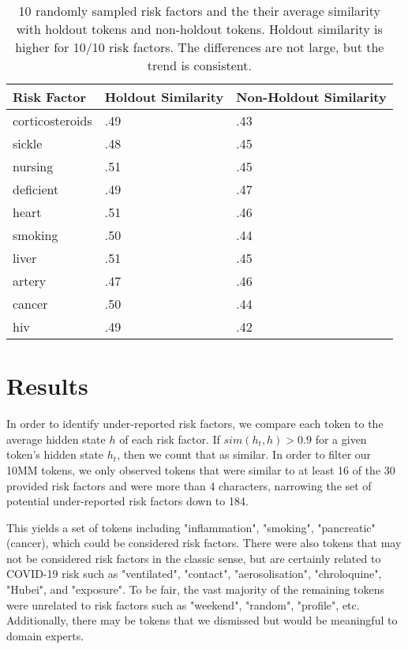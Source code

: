 \documentclass[11pt,a4paper]{article}
\begin{document}
\begin{table*}[h!]
    \centering
    \begin{tabular}{| l | l | l |}
        \hline
        Risk Factor & Holdout Similarity & Non-Holdout Similarity  \\
        \hline
        corticosteroids & .49 & .43 \\
        sickle & .48 & .45 \\
        nursing & .51 & .45 \\
        deficient & .49 & .47 \\
        heart & .51 & .46 \\
        smoking & .50 & .44 \\
        liver & .51 & .45 \\
        artery & .47 & .46 \\
        cancer & .50 & .44 \\
        hiv & .49 & .42 \\
        \hline
    \end{tabular}
    \caption{10 randomly sampled risk factors and the their average similarity with holdout tokens and non-holdout tokens. Holdout similarity is higher for 10/10 risk factors. The differences are not large, but the trend is consistent.}
    \label{tab:3}
\end{table*}

\section{Results}
In order to identify under-reported risk factors, we compare each token to the average hidden state $h$ of each risk factor. If $sim(h_t, h) > 0.9$ for a given token's hidden state $h_t$, then we count that as similar. In order to filter our 10MM tokens, we only observed tokens that were similar to at least 16 of the 30 provided risk factors and were more than 4 characters, narrowing the set of potential under-reported risk factors down to 184. 

This yields a set of tokens including "inflammation", "smoking", "pancreatic" (cancer), which could be considered risk factors. There were also tokens that may not be considered risk factors in the classic sense, but are certainly related to COVID-19 risk such as "ventilated", "contact", "aerosolisation", "chroloquine", "Hubei", and "exposure". To be fair, the vast majority of the remaining tokens were unrelated to risk factors such as "weekend", "random", "profile", etc. Additionally, there may be tokens that we dismissed but would be meaningful to domain experts.
\end{document}
